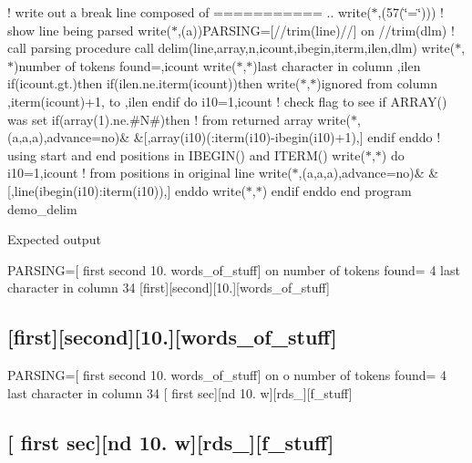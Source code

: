 ! write out a break line composed of =========== .. write($\ast$,\textquotesingle{}(57(\char`\"{}=\char`\"{}))\textquotesingle{}) ! show line being parsed write($\ast$,\textquotesingle{}(a)\textquotesingle{})\textquotesingle{}P\+A\+R\+S\+I\+NG=\mbox{[}\textquotesingle{}//trim(line)//\textquotesingle{}\mbox{]} on \textquotesingle{}//trim(dlm) ! call parsing procedure call delim(line,array,n,icount,ibegin,iterm,ilen,dlm) write($\ast$,$\ast$)\textquotesingle{}number of tokens found=\textquotesingle{},icount write($\ast$,$\ast$)\textquotesingle{}last character in column \textquotesingle{},ilen if(icount.\+gt.)then if(ilen.\+ne.\+iterm(icount))then write($\ast$,$\ast$)\textquotesingle{}ignored from column \textquotesingle{},iterm(icount)+1,\textquotesingle{} to \textquotesingle{},ilen endif do i10=1,icount ! check flag to see if A\+R\+R\+A\+Y() was set if(array(1).ne.\textquotesingle{}\#N\#\textquotesingle{})then ! from returned array write($\ast$,\textquotesingle{}(a,a,a)\textquotesingle{},advance=\textquotesingle{}no\textquotesingle{})\& \&\textquotesingle{}\mbox{[}\textquotesingle{},array(i10)(\+:iterm(i10)-\/ibegin(i10)+1),\textquotesingle{}\mbox{]}\textquotesingle{} endif enddo ! using start and end positions in I\+B\+E\+G\+I\+N() and I\+T\+E\+R\+M() write($\ast$,$\ast$) do i10=1,icount ! from positions in original line write($\ast$,\textquotesingle{}(a,a,a)\textquotesingle{},advance=\textquotesingle{}no\textquotesingle{})\& \&\textquotesingle{}\mbox{[}\textquotesingle{},line(ibegin(i10)\+:iterm(i10)),\textquotesingle{}\mbox{]}\textquotesingle{} enddo write($\ast$,$\ast$) endif enddo end program demo\+\_\+delim

Expected output 

 P\+A\+R\+S\+I\+NG=\mbox{[} first second 10. words\+\_\+of\+\_\+stuff\mbox{]} on number of tokens found= 4 last character in column 34 \mbox{[}first\mbox{]}\mbox{[}second\mbox{]}\mbox{[}10.\mbox{]}\mbox{[}words\+\_\+of\+\_\+stuff\mbox{]} \subsection*{\mbox{[}first\mbox{]}\mbox{[}second\mbox{]}\mbox{[}10.\mbox{]}\mbox{[}words\+\_\+of\+\_\+stuff\mbox{]} }

P\+A\+R\+S\+I\+NG=\mbox{[} first second 10. words\+\_\+of\+\_\+stuff\mbox{]} on o number of tokens found= 4 last character in column 34 \mbox{[} first sec\mbox{]}\mbox{[}nd 10. w\mbox{]}\mbox{[}rds\+\_\+\mbox{]}\mbox{[}f\+\_\+stuff\mbox{]} \subsection*{\mbox{[} first sec\mbox{]}\mbox{[}nd 10. w\mbox{]}\mbox{[}rds\+\_\+\mbox{]}\mbox{[}f\+\_\+stuff\mbox{]} }

